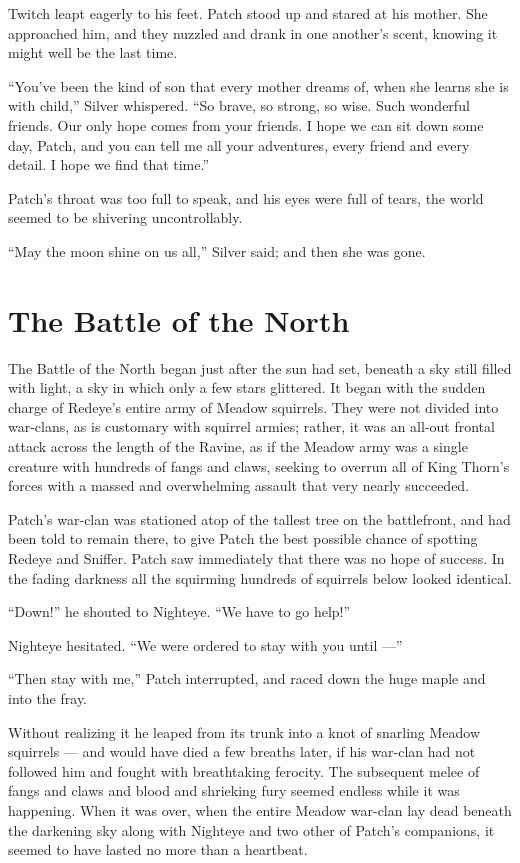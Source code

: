 \documentclass[ebook,oneside,openany,17pt]{memoir}
\newenvironment{tolerant}[1]{%
  \par\tolerance=#1\relax
}{%
  \par
}
\renewcommand{\thechapter}{\Roman{chapter}}
\newcounter{sections}
\newcommand{\sections}[1]{%
  \section*{#1}
  \addtocounter{sections}{1}%
  \pdfbookmark[1]{#1}{section.\thechapter.\thesections}}
\begin{document}
Twitch leapt eagerly to his feet. Patch stood up and stared at his
mother. She approached him, and they nuzzled and drank in one
another’s scent, knowing it might well be the last time.

“You’ve been the kind of son that every mother dreams of, when she
learns she is with child,” Silver whispered. “So brave, so strong, so
wise. Such wonderful friends. Our only hope comes from your friends. I
hope we can sit down some day, Patch, and you can tell me all your
adventures, every friend and every detail. I hope we find that time.”

Patch’s throat was too full to speak, and his eyes were full of tears,
the world seemed to be shivering uncontrollably.

“May the moon shine on us all,” Silver said; and then she was gone.


\sections{The Battle of the North}

\begin{tolerant}{1000}
The Battle of the North began just after the sun had set, beneath a
sky still filled with light, a sky in which only a few stars
glittered. It began with the sudden charge of Redeye’s entire army of
Meadow squirrels. They were not divided into war-clans, as is
customary with squirrel armies; rather, it was an all-out frontal
attack across the length of the Ravine, as if the Meadow army was a
single creature with hundreds of fangs and claws, seeking to overrun
all of King Thorn’s forces with a massed and overwhelming assault that
very nearly succeeded.
\end{tolerant}

Patch’s war-clan was stationed atop of the tallest tree on the
battlefront, and had been told to remain there, to give Patch the best
possible chance of spotting Redeye and Sniffer. Patch saw immediately
that there was no hope of success. In the fading darkness all the
squirming hundreds of squirrels below looked identical.

“Down!” he shouted to Nighteye. “We have to go help!”

Nighteye hesitated. “We were ordered to stay with you until —”

“Then stay with me,” Patch interrupted, and raced down the huge maple
and into the fray.

Without realizing it he leaped from its trunk into a knot of snarling
Meadow squirrels — and would have died a few breaths later, if his
war-clan had not followed him and fought with breathtaking
ferocity. The subsequent melee of fangs and claws and blood and
shrieking fury seemed endless while it was happening. When it was
over, when the entire Meadow war-clan lay dead beneath the darkening
sky along with Nighteye and two other of Patch’s companions, it seemed
to have lasted no more than a heartbeat.
\end{document}
